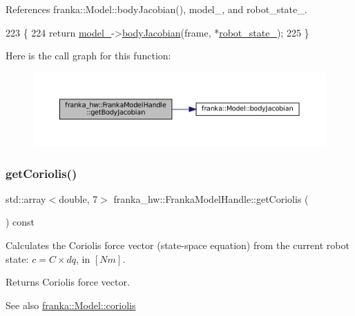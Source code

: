 References franka\+::\+Model\+::body\+Jacobian(), model\+\_\+, and robot\+\_\+state\+\_\+.


\begin{DoxyCode}
223             \{
224     \textcolor{keywordflow}{return} \hyperlink{classfranka__hw_1_1FrankaModelHandle_a0c47e6c735f1bd809581b0498d53349b}{model\_}->\hyperlink{classfranka_1_1Model_af5525104e79cd6b8b05adbf83dc328c1}{bodyJacobian}(frame, *\hyperlink{classfranka__hw_1_1FrankaModelHandle_a16192f263ce4709d99f557c6d8fabeb1}{robot\_state\_});
225   \}
\end{DoxyCode}
Here is the call graph for this function\+:
\nopagebreak
\begin{figure}[H]
\begin{center}
\leavevmode
\includegraphics[width=350pt]{classfranka__hw_1_1FrankaModelHandle_a1b5ba63881c0dc365590c6e116576704_cgraph}
\end{center}
\end{figure}
\mbox{\label{classfranka__hw_1_1FrankaModelHandle_a8464b57e4652399c19c8abf2a426eebe}} 
\subsubsection{\texorpdfstring{get\+Coriolis()}{getCoriolis()}\hspace{0.1cm}{\footnotesize\ttfamily [1/2]}}
{\footnotesize\ttfamily std\+::array$<$double, 7$>$ franka\+\_\+hw\+::\+Franka\+Model\+Handle\+::get\+Coriolis (\begin{DoxyParamCaption}{ }\end{DoxyParamCaption}) const\hspace{0.3cm}{\ttfamily [inline]}}

Calculates the Coriolis force vector (state-\/space equation) from the current robot state\+: $ c= C \times dq$, in $[Nm]$.

\begin{DoxyReturn}{Returns}
Coriolis force vector.
\end{DoxyReturn}
\begin{DoxySeeAlso}{See also}
\hyperlink{classfranka_1_1Model_a9be45a91c3288088dd222f2e55870aa8}{franka\+::\+Model\+::coriolis} 
\end{DoxySeeAlso}


